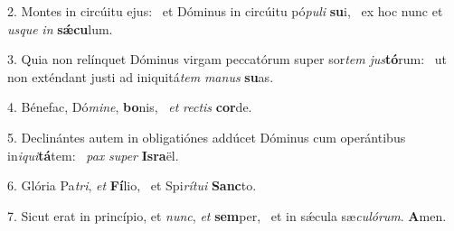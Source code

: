 2. Montes in circúitu ejus: \dag\  et Dóminus in circúitu pó\textit{pu}\textit{li} \textbf{su}i, \ast\  ex hoc nunc et \textit{us}\textit{que} \textit{in} \textbf{sǽ}\textbf{cu}lum.\

3. Quia non relínquet Dóminus virgam peccatórum super sor\textit{tem} \textit{jus}\textbf{tó}rum: \ast\  ut non exténdant justi ad iniquitá\textit{tem} \textit{ma}\textit{nus} \textbf{su}as.\

4. Bénefac, Dó\textit{mi}\textit{ne}, \textbf{bo}nis, \ast\  \textit{et} \textit{rec}\textit{tis} \textbf{cor}de.\

5. Declinántes autem in obligatiónes addúcet Dóminus cum operántibus in\textit{i}\textit{qui}\textbf{tá}tem: \ast\  \textit{pax} \textit{su}\textit{per} \textbf{Is}\textbf{ra}ël.\

6. Glória Pa\textit{tri}, \textit{et} \textbf{Fí}lio, \ast\  et Spi\textit{rí}\textit{tu}\textit{i} \textbf{Sanc}to.\

7. Sicut erat in princípio, et \textit{nunc}, \textit{et} \textbf{sem}per, \ast\  et in sǽcula sæ\textit{cu}\textit{ló}\textit{rum}. \textbf{A}men.\

